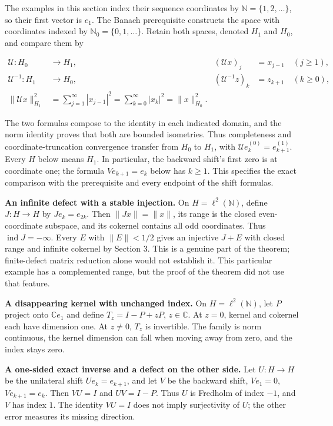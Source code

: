 \documentclass[
  11pt,
]{article}
\begin{document}
The examples in this section index their sequence coordinates by
\(\mathbb N=\{1,2,\ldots\}\), so their first vector is \(e_1\). The
Banach prerequisite constructs the space with coordinates indexed by
\(\mathbb N_0=\{0,1,\ldots\}\). Retain both spaces, denoted \(H_1\) and
\(H_0\), and compare them by

\[
 \begin{aligned}
 \mathcal U:H_0&\longrightarrow H_1,&
       (\mathcal Ux)_j&=x_{j-1}\quad(j\geq1),\\
 \mathcal U^{-1}:H_1&\longrightarrow H_0,&
       (\mathcal U^{-1}z)_k&=z_{k+1}\quad(k\geq0),\\
 \|\mathcal Ux\|_{H_1}^2
 &=\sum_{j=1}^{\infty}|x_{j-1}|^2
  =\sum_{k=0}^{\infty}|x_k|^2=\|x\|_{H_0}^2.
 \end{aligned}
 \tag{F20a}
\]

The two formulas compose to the identity in each indicated domain, and
the norm identity proves that both are bounded isometries. Thus
completeness and coordinate-truncation convergence transfer from \(H_0\)
to \(H_1\), with \(\mathcal Ue_k^{(0)}=e_{k+1}^{(1)}\). Every \(H\)
below means \(H_1\). In particular, the backward shift's first zero is
at coordinate one; the formula \(Ve_{k+1}=e_k\) below has \(k\geq1\).
This specifies the exact comparison with the prerequisite and every
endpoint of the shift formulas.

\textbf{An infinite defect with a stable injection.} On
\(H=\ell^2(\mathbb N)\), define \(J:H\to H\) by \(Je_k=e_{2k}\). Then
\(\|Jx\|=\|x\|\), its range is the closed even-coordinate subspace, and
its cokernel contains all odd coordinates. Thus
\(\operatorname{ind}J=-\infty\). Every \(E\) with \(\|E\|<1/2\) gives an
injective \(J+E\) with closed range and infinite cokernel by Section 3.
This is a genuine part of the theorem; finite-defect matrix reduction
alone would not establish it. This particular example has a complemented
range, but the proof of the theorem did not use that feature.

\textbf{A disappearing kernel with unchanged index.} On
\(H=\ell^2(\mathbb N)\), let \(P\) project onto \(\mathbb Ce_1\) and
define \(T_z=I-P+zP\), \(z\in\mathbb C\). At \(z=0\), kernel and
cokernel each have dimension one. At \(z\ne0\), \(T_z\) is invertible.
The family is norm continuous, the kernel dimension can fall when moving
away from zero, and the index stays zero.

\textbf{A one-sided exact inverse and a defect on the other side.} Let
\(U:H\to H\) be the unilateral shift \(Ue_k=e_{k+1}\), and let \(V\) be
the backward shift, \(Ve_1=0\), \(Ve_{k+1}=e_k\). Then \(VU=I\) and
\(UV=I-P\). Thus \(U\) is Fredholm of index \(-1\), and \(V\) has index
\(1\). The identity \(VU=I\) does not imply surjectivity of \(U\); the
other error measures its missing direction.
\end{document}
